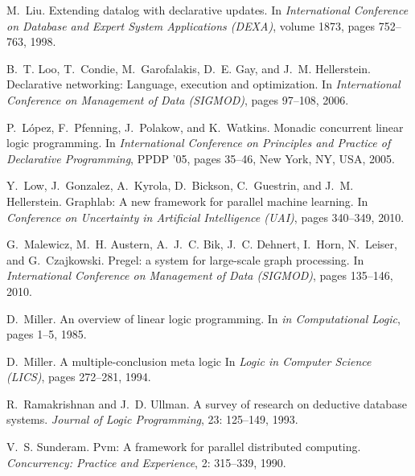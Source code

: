 \documentclass{sigplanconf}
\begin{document}
\begin{thebibliography}{35}
M.~Liu.
\newblock Extending datalog with declarative updates.
\newblock In \emph{International Conference on Database and Expert System
  Applications (DEXA)}, volume 1873, pages 752--763, 1998.

B.~T. Loo, T.~Condie, M.~Garofalakis, D.~E. Gay, and J.~M. Hellerstein.
\newblock Declarative networking: Language, execution and optimization.
\newblock In \emph{International Conference on Management of Data (SIGMOD)},
  pages 97--108, 2006.

P.~L\'{o}pez, F.~Pfenning, J.~Polakow, and K.~Watkins.
\newblock Monadic concurrent linear logic programming.
\newblock In \emph{International Conference on Principles and Practice of Declarative Programming}, PPDP '05, pages
  35--46, New York, NY, USA, 2005.

Y.~Low, J.~Gonzalez, A.~Kyrola, D.~Bickson, C.~Guestrin, and J.~M. Hellerstein.
\newblock Graphlab: {A} new framework for parallel machine learning.
\newblock In \emph{Conference on Uncertainty in Artificial Intelligence (UAI)},
  pages 340--349, 2010.

G.~Malewicz, M.~H. Austern, A.~J.~C. Bik, J.~C. Dehnert, I.~Horn, N.~Leiser,
  and G.~Czajkowski.
\newblock Pregel: a system for large-scale graph processing.
\newblock In \emph{International Conference on Management of Data (SIGMOD)},
  pages 135--146, 2010.

D.~Miller.
\newblock An overview of linear logic programming.
\newblock In \emph{in Computational Logic}, pages 1--5, 1985.

D.~Miller.
\newblock A multiple-conclusion meta logic
\newblock In \emph{Logic in Computer Science (LICS)}, pages 272--281, 1994.

R.~Ramakrishnan and J.~D. Ullman.
\newblock A survey of research on deductive database systems.
\newblock \emph{Journal of Logic Programming}, 23: 125--149, 1993.

V.~S. Sunderam.
\newblock Pvm: A framework for parallel distributed computing.
\newblock \emph{Concurrency: Practice and Experience}, 2: 315--339,
  1990.


\end{thebibliography}
\end{document}
